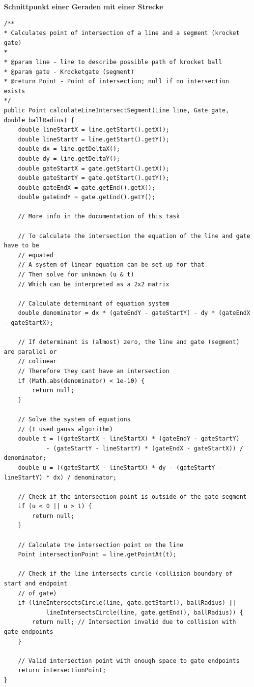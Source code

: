 \documentclass[a4paper,10pt,ngerman]{scrartcl}
\begin{document}
\textbf{Schnittpunkt einer Geraden mit einer Strecke}
\begin{lstlisting}
/**
* Calculates point of intersection of a line and a segment (krocket gate)
* 
* @param line - line to describe possible path of krocket ball
* @param gate - Krocketgate (segment)
* @return Point - Point of intersection; null if no intersection exists
*/
public Point calculateLineIntersectSegment(Line line, Gate gate, double ballRadius) {
    double lineStartX = line.getStart().getX();
    double lineStartY = line.getStart().getY();
    double dx = line.getDeltaX();
    double dy = line.getDeltaY();
    double gateStartX = gate.getStart().getX();
    double gateStartY = gate.getStart().getY();
    double gateEndX = gate.getEnd().getX();
    double gateEndY = gate.getEnd().getY();

    // More info in the documentation of this task

    // To calculate the intersection the equation of the line and gate have to be
    // equated
    // A system of linear equation can be set up for that
    // Then solve for unknown (u & t)
    // Which can be interpreted as a 2x2 matrix

    // Calculate determinant of equation system
    double denominator = dx * (gateEndY - gateStartY) - dy * (gateEndX - gateStartX);

    // If determinant is (almost) zero, the line and gate (segment) are parallel or
    // colinear
    // Therefore they cant have an intersection
    if (Math.abs(denominator) < 1e-10) {
        return null;
    }

    // Solve the system of equations
    // (I used gauss algorithm)
    double t = ((gateStartX - lineStartX) * (gateEndY - gateStartY)
            - (gateStartY - lineStartY) * (gateEndX - gateStartX)) / denominator;
    double u = ((gateStartX - lineStartX) * dy - (gateStartY - lineStartY) * dx) / denominator;

    // Check if the intersection point is outside of the gate segment 
    if (u < 0 || u > 1) {
        return null;
    }

    // Calculate the intersection point on the line
    Point intersectionPoint = line.getPointAt(t);

    // Check if the line intersects circle (collision boundary of start and endpoint
    // of gate)
    if (lineIntersectsCircle(line, gate.getStart(), ballRadius) ||
            lineIntersectsCircle(line, gate.getEnd(), ballRadius)) {
        return null; // Intersection invalid due to collision with gate endpoints
    }

    // Valid intersection point with enough space to gate endpoints
    return intersectionPoint;
}
\end{lstlisting}
\end{document}
